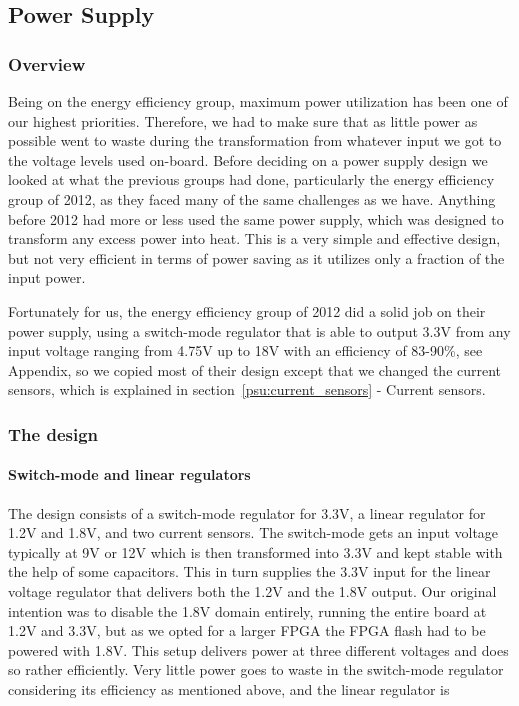 \subsection{Power Supply}
\subsubsection{Overview}
Being on the energy efficiency group, maximum power utilization has been one of
our highest priorities. Therefore, we had to make sure that as little power as
possible went to waste during the transformation from whatever input we got to
the voltage levels used on-board. Before deciding on a power supply design we
looked at what the previous groups had done, particularly the energy efficiency
group of 2012, as they faced many of the same challenges as we have. Anything
before 2012 had more or less used the same power supply, which was
designed to transform any excess power into heat. This is a very simple and
effective design, but not very efficient in terms of power saving as it utilizes
only a fraction of the input power.

Fortunately for us, the energy efficiency group of 2012 did a solid job on their
power supply, using a switch-mode regulator that is able to output 3.3V from
any input voltage ranging from 4.75V up to 18V with an efficiency of 83-90\%, see
Appendix, so we copied most of their design
except that we changed the current sensors, which is explained in section~\ref{psu:current_sensors} - Current sensors.

\subsubsection{The design}
\paragraph{Switch-mode and linear regulators}
The design consists of a switch-mode regulator for 3.3V, a linear regulator for
1.2V and 1.8V, and two current sensors. The switch-mode gets an input voltage typically at
9V or 12V which is then transformed into 3.3V and kept stable with the help of
some capacitors. This in turn supplies the 3.3V input for the linear voltage
regulator that delivers both the 1.2V and the 1.8V output. Our original
intention was to disable the 1.8V domain entirely, running the entire board at
1.2V and 3.3V, but as we opted for a larger FPGA the FPGA flash had to be
powered with 1.8V. This setup delivers power at three different voltages and
does so rather efficiently. Very little power goes to waste in the switch-mode
regulator considering its efficiency as mentioned above, and the linear
regulator is 

